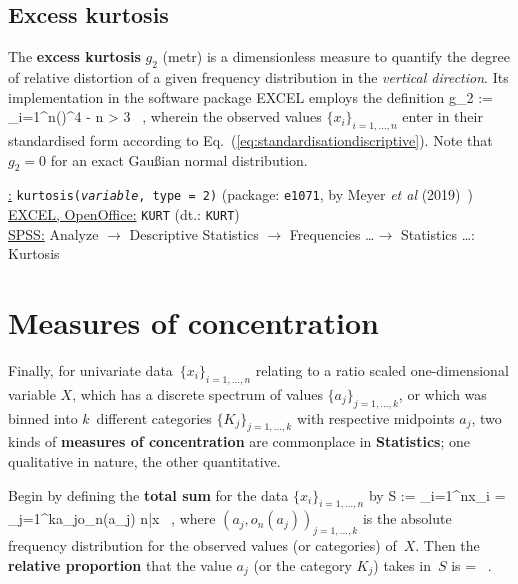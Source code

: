 \subsection[Excess kurtosis]{Excess kurtosis}
The \textbf{excess kurtosis} $g_{2}$ (metr) is a dimensionless 
measure to quantify the degree of relative distortion of a given 
frequency distribution in the \textit{vertical direction}. Its 
implementation in the software package EXCEL employs the definition
%
\be
{}
g_{2} := 
\sum_{i=1}^{n}\left(\right)^{4} - 
\qquad{}\quad n > 3 \ ,
\ee
%
wherein the observed values $\{x_{i}\}_{i=1,\ldots,n}$ enter in
their standardised form according to 
Eq.~(\ref{eq:standardisationdiscriptive}). Note that $g_{2}=0$ for 
an exact Gau\ss ian normal distribution.

\medskip
\noindent
\underline{\R:} \texttt{kurtosis(\textit{variable},
type = 2)} (package: \texttt{e1071}, by Meyer \textit{et al}
(2019)~) \\
\underline{EXCEL, OpenOffice:} \texttt{KURT} (dt.:
\texttt{KURT}) \\
\underline{SPSS:} Analyze $\rightarrow$ Descriptive Statistics
$\rightarrow$ Frequencies \ldots $\rightarrow$ Statistics
\ldots: Kurtosis

\section[Measures of concentration]{Measures of concentration}
Finally, for univariate data~$\{x_{i}\}_{i=1,\ldots,n}$ relating 
to a ratio scaled one-dimensional variable $X$, which has a 
discrete spectrum of values $\{a_{j}\}_{j=1,\ldots,k}$, or which
was binned into $k$~different categories $\{K_{j}\}_{j=1,\ldots,k}$ 
with respective midpoints $a_{j}$, two kinds of \textbf{measures of 
concentration} are commonplace in \textbf{Statistics}; one 
qualitative in nature, the other quantitative.


\medskip
\noindent
Begin by defining the \textbf{total sum} for the data 
$\{x_{i}\}_{i=1,\ldots,n}$ by
%
\be
{}
S := \sum_{i=1}^{n}x_{i}
= \sum_{j=1}^{k}a_{j}o_{n}(a_{j})
 n\bar{x} \ ,
\ee
%
where $(a_{j},o_{n}(a_{j}))_{j=1,\ldots,k}$ is the absolute 
frequency distribution for the observed values (or categories) 
of~$X$. Then the \textbf{relative proportion} that the value
$a_{j}$ (or the category $K_{j}$) takes in~$S$ is
%
\be
{}
 =  \ .
\ee
%

